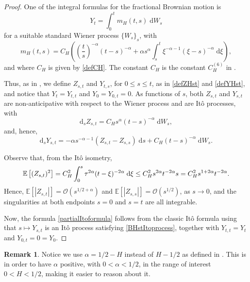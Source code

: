\documentclass[reqno,12pt]{amsart}
\theoremstyle{plain}%
\theoremstyle{definition}
\newtheorem{rmk}{Remark}[section]
\begin{document}
\begin{proof}
One of the integral formulas for the fractional Brownian motion is \cite[Section 1.8]{Mishura2008}
\[
    Y_t = \int_0^t m_H(t, s) \;\mathrm{d}W_s
\]
for a suitable standard Wiener process $\{W_s\}_s$, with
\[
    m_H(t, s) = C_H \left( \left(\frac{t}{s}\right)^{-\alpha} (t - s)^{-\alpha} + \alpha s^{\alpha}\int_s^t\xi^{-\alpha-1}(\xi - s)^{-\alpha}\;\mathrm{d}\xi\right),
\]
and where $C_H$ is given by \eqref{defCH}. The constant $C_H$ is the constant $C_H^{(6)}$ in \cite[Section 1.8]{Mishura2008}.

Thus, as in \cite[Section 2.7.4]{Mishura2008}, we define $Z_{s, t}$ and $Y_{t, s}$, for $0 \leq s \leq t$, as in \eqref{defZHst} and \eqref{defYHst}, and notice that $Y_t = Y_{t, t}$ and $Y_0 = Y_{0, t} = 0$. As functions of $s$, both $Z_{s, t}$ and $Y_{s, t}$ are non-anticipative with respect to the Wiener process and are It\^o processes, with
\begin{equation}
    \label{YHstItoprocess}
    \mathrm{d}_s Z_{s, t} = C_H s^{\alpha}(t - s)^{-\alpha} \;\mathrm{d}W_s,
\end{equation}
and, hence,
\begin{equation}
    \label{BHstItoprocess}
    \mathrm{d}_s Y_{s, t} = -\alpha s^{-\alpha - 1} (Z_{s, t} - Z_{s, s})\;\mathrm{d}s + C_H (t - s)^{-\alpha} \;\mathrm{d}W_s.
\end{equation}

Observe that, from the It\^o isometry,
\[
    \mathbb{E}\left[(Z_{s, t})^2\right] = C_H^2 \int_0^s \tau^{2\alpha}(t - \xi)^{-2\alpha}\;\mathrm{d}\xi \\
    \leq C_H^2 s^{2\alpha}t^{-2\alpha}s = C_H^2 s^{1+2\alpha}t^{-2\alpha}.
\]
Hence, $\mathbb{E}[|Z_{s, t}|] = \mathcal{O}(s^{1/2+\alpha})$ and $\mathbb{E}[|Z_{s, s}|] = \mathcal{O}(s^{1/2})$, as $s\rightarrow 0$, and the singularities at both endpoints $s=0$ and $s=t$ are all integrable.

Now, the formula \eqref{partialItoformula} follows from the classic It\^o formula using that $s \mapsto Y_{s, t}$ is an It\^o process satisfying \eqref{BHstItoprocess}, together with $Y_{t, t} = Y_t$ and $Y_{0, t} = 0 = Y_0$.
\end{proof}

\begin{rmk}
    Notice we use $\alpha = 1/2 - H$ instead of $H - 1/2$ as defined in \cite[Section 1.8]{Mishura2008}. This is in order to have $\alpha$ positive, with $0 < \alpha < 1/2$, in the range of interest $0 < H < 1/2$, making it easier to reason about it.
\end{rmk}
\end{document}
